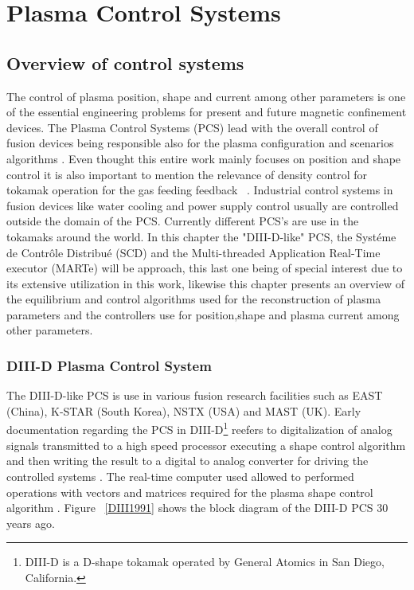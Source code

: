 \chapter{Plasma Control Systems}
\label{Chap2}
\section{Overview of control systems}
The control of  plasma position, shape and current among other parameters is one of the essential engineering problems for present and future magnetic confinement devices. The Plasma Control Systems (PCS) lead with the overall control of  fusion devices being responsible also for the  plasma configuration and scenarios algorithms \cite[Chapter~8]{PCS_2018}. Even thought this entire work mainly focuses on position and shape control it is also important to mention the relevance of density control for tokamak operation for the gas feeding feedback ~\cite{densityControl}. Industrial control systems in fusion devices like water cooling and power supply control usually are controlled outside the domain of the PCS. Currently different PCS's are use in the tokamaks around the world. In this chapter the "DIII-D-like" PCS, the Syst\'eme de Contr\^ole Distribu\'e (SCD) and the Multi-threaded Application Real-Time executor (MARTe) will be approach, this last one being of special interest due to its extensive utilization in this work, likewise this chapter presents an overview of the equilibrium and control algorithms used for the reconstruction of plasma parameters and the controllers use for position,shape and plasma current among other parameters. 

\subsection{DIII-D Plasma Control System}  

The DIII-D-like PCS is use in various fusion research facilities such as EAST (China), K-STAR (South Korea), NSTX (USA) and MAST (UK). Early documentation regarding the PCS in DIII-D\footnote{DIII-D is a D-shape tokamak operated by General Atomics in San Diego, California. } reefers to digitalization of analog signals transmitted to a high speed processor executing a shape control algorithm and then writing the result to a digital to analog converter for driving the controlled systems . The real-time computer used allowed to performed operations with vectors and matrices required for the plasma shape control algorithm \cite{DIIDcontrol}. Figure ~\ref{DIII1991} shows the block diagram of the DIII-D PCS 30 years ago.
\smallskip

